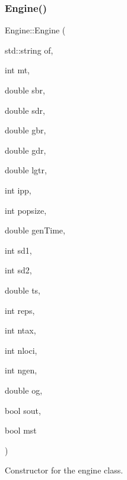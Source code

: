 \subsubsection{\texorpdfstring{Engine()}{Engine()}}
{\footnotesize\ttfamily Engine\+::\+Engine (\begin{DoxyParamCaption}\item[{std\+::string}]{of,  }\item[{int}]{mt,  }\item[{double}]{sbr,  }\item[{double}]{sdr,  }\item[{double}]{gbr,  }\item[{double}]{gdr,  }\item[{double}]{lgtr,  }\item[{int}]{ipp,  }\item[{int}]{popsize,  }\item[{double}]{gen\+Time,  }\item[{int}]{sd1,  }\item[{int}]{sd2,  }\item[{double}]{ts,  }\item[{int}]{reps,  }\item[{int}]{ntax,  }\item[{int}]{nloci,  }\item[{int}]{ngen,  }\item[{double}]{og,  }\item[{bool}]{sout,  }\item[{bool}]{mst }\end{DoxyParamCaption})}



Constructor for the engine class. 


